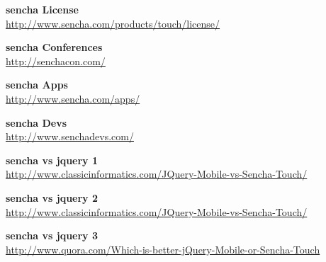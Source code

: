 \documentclass[a4paper,12pt]{book}
\begin{document}
\begin{thebibliography}{25}
\textbf{sencha License}\\
{\footnotesize\url{http://www.sencha.com/products/touch/license/}}

\textbf{sencha Conferences}\\
{\footnotesize\url{http://senchacon.com/}}

\textbf{sencha Apps}\\
{\footnotesize\url{http://www.sencha.com/apps/}}

\textbf{sencha Devs}\\
{\footnotesize\url{http://www.senchadevs.com/}}

\textbf{sencha vs jquery 1}\\
{\footnotesize\url{http://www.classicinformatics.com/JQuery-Mobile-vs-Sencha-Touch/}}

\textbf{sencha vs jquery 2}\\
{\footnotesize\url{http://www.classicinformatics.com/JQuery-Mobile-vs-Sencha-Touch/}}

\textbf{sencha vs jquery 3}\\
{\footnotesize\url{http://www.quora.com/Which-is-better-jQuery-Mobile-or-Sencha-Touch}}


\end{thebibliography}
\end{document}
